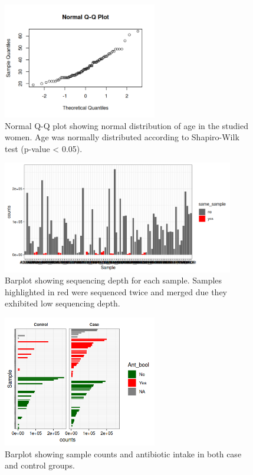 \documentclass[biotech,article,submit,pdftex,moreauthors]{Definitions/mdpi}
\begin{document}
\begin{figure}[H]
	\centering
	\includegraphics[width = 0.6\textwidth]{figures/qqplot.png}
	\caption{Normal Q-Q plot showing normal distribution of age in the studied women. Age was normally distributed according to Shapiro-Wilk test (p-value < 0.05).}
	\label{sfig:qqplot}
\end{figure}

\begin{figure}[H]
	\centering
	\includegraphics[width = 0.9\textwidth]{figures/sample_sums_bm.png}
	\caption{Barplot showing sequencing depth for each sample. Samples highlighted in red were sequenced twice and merged due they exhibited low sequencing depth.}
	\label{sfig:sample_sums}
\end{figure}

\begin{figure}[H]
	\centering
	\includegraphics[width = 0.6\textwidth]{figures/counts_ant.png}
	\caption{Barplot showing sample counts and antibiotic intake in both case and control groups.}
	\label{sfig:counts_ant}
\end{figure}
\end{document}
